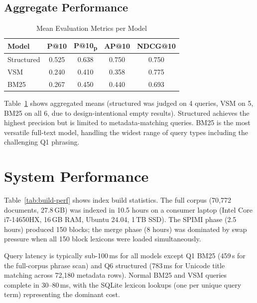 \documentclass[sigconf,nonacm]{acmart}
\begin{document}
\subsection{Aggregate Performance}

\begin{table}[h]
\centering
\caption{Mean Evaluation Metrics per Model}
\label{tab:model-summary}
\begin{tabular}{lcccc}
\toprule
Model & P@10 & P@10\textsubscript{p} & AP@10 & NDCG@10 \\
\midrule
Structured & 0.525 & 0.638 & 0.750 & 0.750 \\
VSM        & 0.240 & 0.410 & 0.358 & 0.775 \\
BM25       & 0.267 & 0.450 & 0.440 & 0.693 \\
\bottomrule
\end{tabular}
\end{table}

Table~\ref{tab:model-summary} shows aggregated means (structured was judged on
4 queries, VSM on 5, BM25 on all 6, due to design-intentional empty results).
Structured achieves the highest precision but is limited to metadata-matching
queries.  BM25 is the most versatile full-text model, handling the widest range
of query types including the challenging Q1 phrasing.

\section{System Performance}



Table~\ref{tab:build-perf} shows index build statistics.  The full corpus
(70{,}772 documents, 27.8\,GB) was indexed in 10.5 hours on a consumer laptop
(Intel Core i7-14650HX, 16\,GB RAM, Ubuntu 24.04, 1\,TB SSD).  The SPIMI phase
(2.5 hours) produced 150 blocks; the merge phase (8 hours) was dominated by
swap pressure when all 150 block lexicons were loaded simultaneously.

Query latency is typically sub-100\,ms for all models except Q1 BM25 (459\,s
for the full-corpus phrase scan) and Q6 structured (783\,ms for Unicode title
matching across 72{,}180 metadata rows).  Normal BM25 and VSM queries complete
in 30--80\,ms, with the SQLite lexicon lookups (one per unique query term)
representing the dominant cost.

\end{document}

